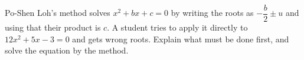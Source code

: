 Po-Shen Loh's method solves $x^2+bx+c=0$ by writing the roots as $-\dfrac {b}{2}\pm u$ and using that their product is $c$. A student tries to apply it directly to $12x^2+5x-3=0$ and gets wrong roots. Explain what must be done first, and solve the equation by the method.
